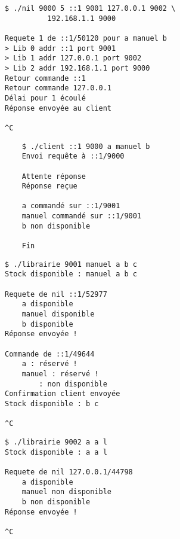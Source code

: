 \documentclass[10pt,a4paper]{article}
\begin{document}
\begin{multicols*}{2}
	
\begin{verbatim}
$ ./nil 9000 5 ::1 9001 127.0.0.1 9002 \
          192.168.1.1 9000

Requete 1 de ::1/50120 pour a manuel b 
> Lib 0 addr ::1 port 9001
> Lib 1 addr 127.0.0.1 port 9002
> Lib 2 addr 192.168.1.1 port 9000
Retour commande ::1
Retour commande 127.0.0.1
Délai pour 1 écoulé
Réponse envoyée au client

^C
\end{verbatim}



\begin{verbatim}
	$ ./client ::1 9000 a manuel b
	Envoi requête à ::1/9000
	
	Attente réponse
	Réponse reçue

	a commandé sur ::1/9001
	manuel commandé sur ::1/9001
	b non disponible
	
	Fin
\end{verbatim}

\vfill\null
\columnbreak

\begin{verbatim}
$ ./librairie 9001 manuel a b c
Stock disponible : manuel a b c 

Requete de nil ::1/52977
	a disponible
	manuel disponible
	b disponible
Réponse envoyée !

Commande de ::1/49644
	a : réservé !
	manuel : réservé !
		: non disponible
Confirmation client envoyée
Stock disponible : b c 	

^C
\end{verbatim}



\begin{verbatim}
$ ./librairie 9002 a a l
Stock disponible : a a l 

Requete de nil 127.0.0.1/44798
	a disponible
	manuel non disponible
	b non disponible
Réponse envoyée !

^C
\end{verbatim}


\end{multicols*}
\end{document}
